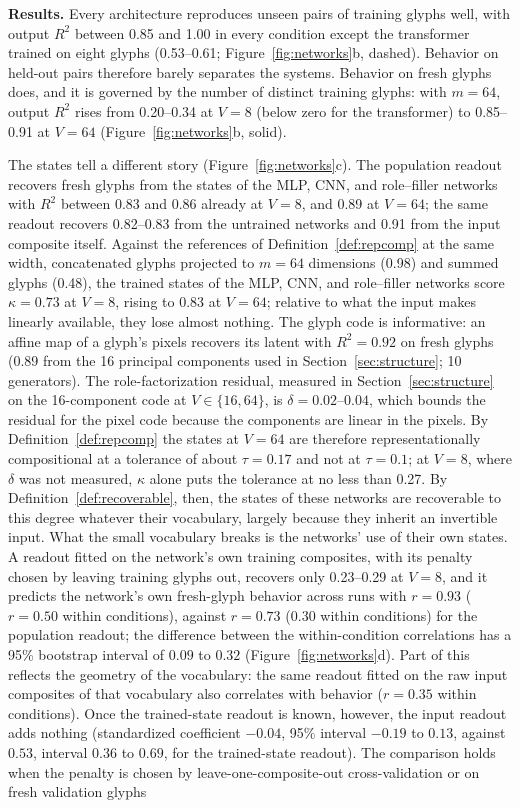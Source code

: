 \documentclass[10pt]{article}
\theoremstyle{plain}
\theoremstyle{remark}
\begin{document}
\textbf{Results.} Every architecture reproduces unseen pairs of training glyphs well, with output $R^2$ between 0.85 and 1.00 in every condition except the transformer trained on eight glyphs (0.53--0.61; Figure~\ref{fig:networks}b, dashed). Behavior on held-out pairs therefore barely separates the systems. Behavior on fresh glyphs does, and it is governed by the number of distinct training glyphs: with $m = 64$, output $R^2$ rises from 0.20--0.34 at $V = 8$ (below zero for the transformer) to 0.85--0.91 at $V = 64$ (Figure~\ref{fig:networks}b, solid).

The states tell a different story (Figure~\ref{fig:networks}c). The population readout recovers fresh glyphs from the states of the MLP, CNN, and role--filler networks with $R^2$ between 0.83 and 0.86 already at $V = 8$, and 0.89 at $V = 64$; the same readout recovers 0.82--0.83 from the untrained networks and 0.91 from the input composite itself. Against the references of Definition~\ref{def:repcomp} at the same width, concatenated glyphs projected to $m = 64$ dimensions (0.98) and summed glyphs (0.48), the trained states of the MLP, CNN, and role--filler networks score $\kappa = 0.73$ at $V = 8$, rising to $0.83$ at $V = 64$; relative to what the input makes linearly available, they lose almost nothing. The glyph code is informative: an affine map of a glyph's pixels recovers its latent with $R^2 = 0.92$ on fresh glyphs (0.89 from the 16 principal components used in Section~\ref{sec:structure}; 10 generators). The role-factorization residual, measured in Section~\ref{sec:structure} on the 16-component code at $V \in \{16, 64\}$, is $\delta = 0.02$--$0.04$, which bounds the residual for the pixel code because the components are linear in the pixels. By Definition~\ref{def:repcomp} the states at $V = 64$ are therefore representationally compositional at a tolerance of about $\tau = 0.17$ and not at $\tau = 0.1$; at $V = 8$, where $\delta$ was not measured, $\kappa$ alone puts the tolerance at no less than 0.27. By Definition~\ref{def:recoverable}, then, the states of these networks are recoverable to this degree whatever their vocabulary, largely because they inherit an invertible input. What the small vocabulary breaks is the networks' use of their own states. A readout fitted on the network's own training composites, with its penalty chosen by leaving training glyphs out, recovers only 0.23--0.29 at $V = 8$, and it predicts the network's own fresh-glyph behavior across runs with $r = 0.93$ ($r = 0.50$ within conditions), against $r = 0.73$ ($0.30$ within conditions) for the population readout; the difference between the within-condition correlations has a 95\% bootstrap interval of $0.09$ to $0.32$ (Figure~\ref{fig:networks}d). Part of this reflects the geometry of the vocabulary: the same readout fitted on the raw input composites of that vocabulary also correlates with behavior ($r = 0.35$ within conditions). Once the trained-state readout is known, however, the input readout adds nothing (standardized coefficient $-0.04$, 95\% interval $-0.19$ to $0.13$, against $0.53$, interval $0.36$ to $0.69$, for the trained-state readout). The comparison holds when the penalty is chosen by leave-one-composite-out cross-validation or on fresh validation glyphs 
\end{document}
